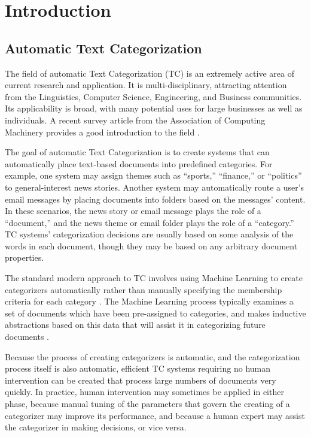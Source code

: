 \chapter{Introduction}
\label{intro}

\section{Automatic Text Categorization}
\label{tc-intro}

The field of automatic Text Categorization (TC) is an extremely active
area of current research and application.  It is multi-disciplinary,
attracting attention from the Linguistics, Computer Science,
Engineering, and Business communities.  Its applicability is broad,
with many potential uses for large businesses as well as individuals.
A recent survey article from the Association of Computing Machinery
provides a good introduction to the field \cite{sebastiani:02}.

The goal of automatic Text Categorization is to create systems that
can automatically place text-based documents into predefined
categories.  For example, one system may assign themes such as
``sports,'' ``finance,'' or ``politics'' to general-interest news
stories.  Another system may automatically route a user's email
messages by placing documents into folders based on the messages' content.  In these
scenarios, the news
story or email message plays the role of a ``document,'' and the news
theme or email folder plays the role of a ``category.''  TC systems'
categorization decisions are usually based on some analysis of the
words in each document, though they may be based on any arbitrary
document properties.

The standard modern approach to TC involves using Machine Learning to
create categorizers automatically rather than manually specifying the
membership criteria for each
category \cite[p. 2]{sebastiani:02}. The Machine Learning process
typically examines a set of documents which have
been pre-assigned to categories, and makes inductive abstractions
based on this data that will assist it in categorizing future
documents \cite[sec. 2.7]{mitchell:97}.

Because the process of creating categorizers is automatic, and the
categorization process itself is also automatic, efficient TC systems
requiring no human intervention can be created that process large
numbers of documents very quickly.  In practice, human intervention
may sometimes be applied in either phase, because manual tuning of the
parameters that govern the creating of a categorizer may improve its
performance, and because a human expert may assist the categorizer in
making decisions, or vice versa.


